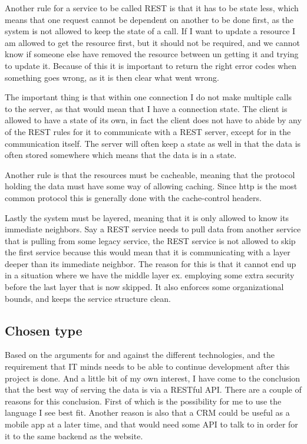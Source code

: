 Another rule for a service to be called REST is that it has to be state less, which means that one request cannot be dependent on another to be done first, as the system is not allowed to keep the state of a call. If I want to update a resource I am allowed to get the resource first, but it should not be required, and we cannot know if someone else have removed the resource between un getting it and trying to update it. Because of this it is important to return the right error codes when something goes wrong, as it is then clear what went wrong.

The important thing is that within one connection I do not make multiple calls to the server, as that would mean that I have a connection state. The client is allowed to have a state of its own, in fact the client does not have to abide by any of the REST rules for it to communicate with a REST server, except for in the communication itself. The server will often keep a state as well in that the data is often stored somewhere which means that the data is in a state.

Another rule is that the resources must be cacheable, meaning that the protocol holding the data must have some way of allowing caching. Since http is the most common protocol this is generally done with the cache-control headers\cite{rest:elkstein:architeture}.

Lastly the system must be layered\cite{rest:uci}, meaning that it is only allowed to know its immediate neighbors. Say a REST service needs to pull data from another service that is pulling from some legacy service, the REST service is not allowed to skip the first service because this would mean that it is communicating with a layer deeper than its immediate neighbor. The reason for this is that it cannot end up in a situation where we have the middle layer ex. employing some extra security before the last layer that is now skipped. It also enforces some organizational bounds, and keeps the service structure clean.

\subsection{Chosen type }
\label{sub:Chosen type}
Based on the arguments for and against the different technologies, and the requirement that IT minds needs to be able to continue development after this project is done. And a little bit of my own interest, I have come to the conclusion that the best way of serving the data is via a RESTful API. There are a couple of reasons for this conclusion. First of which is the possibility for me to use the language I see best fit. Another reason is also that a CRM could be useful as a mobile app at a later time, and that would need some API to talk to in order for it to the same backend as the website.

